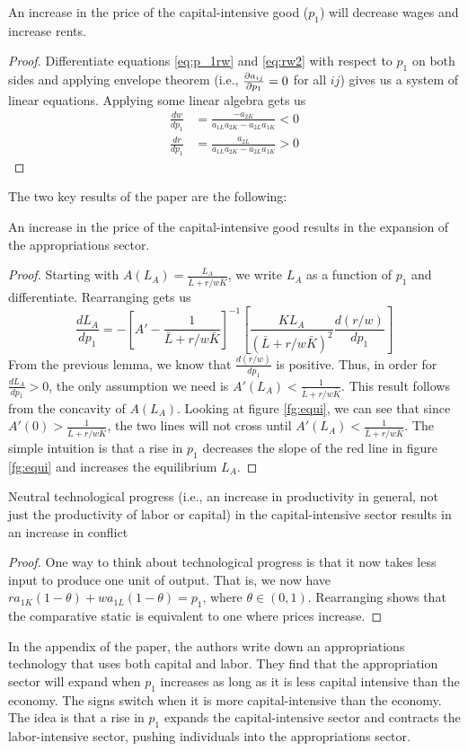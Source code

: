 \begin{lemma}
An increase in the price of the capital-intensive good ($p_1$) will decrease wages and increase rents.
\end{lemma}
\begin{proof}
    Differentiate equations \ref{eq:p_1rw} and \ref{eq:rw2} with respect to $p_1$ on both sides and applying envelope theorem (i.e., $\frac{\partial a_{ij}}{\partial p_1} = 0$ for all $ij$) gives us a system of linear equations. Applying some linear algebra gets us
    \begin{align*}
        \frac{dw}{dp_1} & = \frac{-a_{2K}}{a_{1L}a_{2K}-a_{2L}a_{1K}} < 0 \\ 
        \frac{dr}{dp_1} & = \frac{a_{2L}}{a_{1L}a_{2K}-a_{2L}a_{1K}} > 0
    \end{align*}
\end{proof}
The two key results of the paper are the following:
\begin{proposition}
    An increase in the price of the capital-intensive good results in the expansion of the appropriations sector.
\end{proposition}
\begin{proof}
    Starting with $A(L_A) = \frac{L_A}{\bar{L} + r/w\bar{K}}$, we write $L_A$ as a function of $p_1$ and differentiate. Rearranging gets us
    $$\frac{dL_A}{dp_1} = - \left[A' - \frac{1}{\bar{L} + r/w\bar{K}}\right]^{-1}\left[\frac{KL_A}{(\bar{L} + r/w\bar{K})^2}\frac{d(r/w)}{dp_1}\right]$$
    From the previous lemma, we know that $\frac{d(r/w)}{dp_1}$ is positive. Thus, in order for $\frac{dL_A}{dp_1} > 0$, the only assumption we need is $A'(L_A) < \frac{1}{\bar{L} + r/w\bar{K}}$. This result follows from the concavity of $A(L_A)$. Looking at figure \ref{fg:equi}, we can see that since $A'(0) >  \frac{1}{\bar{L} + r/w\bar{K}}$, the two lines will not cross until $A'(L_A) < \frac{1}{\bar{L} + r/w\bar{K}}$. The simple intuition is that a rise in $p_1$ decreases the slope of the red line in figure \ref{fg:equi} and increases the equilibrium $L_A$.
\end{proof}
\begin{proposition}
    Neutral technological progress (i.e., an increase in productivity in general, not just the productivity of labor or capital) in the capital-intensive sector results in an increase in conflict
\end{proposition}
\begin{proof}
    One way to think about technological progress is that it now takes less input to produce one unit of output. That is, we now have $ra_{1K}(1- \theta) + wa_{1L}(1-\theta) = p_1$, where $\theta \in (0,1)$. Rearranging shows that the comparative static is equivalent to one where prices increase. 
\end{proof}
In the appendix of the paper, the authors write down an appropriations technology that uses both capital and labor. They find that the appropriation sector will expand when $p_1$ increases as long as it is less capital intensive than the economy. The signs switch when it is more capital-intensive than the economy. The idea is that a rise in $p_1$ expands the capital-intensive sector and contracts the labor-intensive sector, pushing individuals into the appropriations sector.

